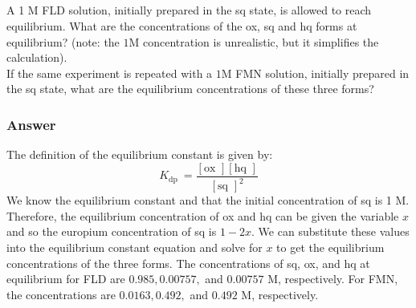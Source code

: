 \documentclass[12pt]{article}
\begin{document}
\subsection{}
A 1 M FLD solution, initially prepared in the sq state, is allowed to reach equilibrium. What are the concentrations of the ox, sq and hq forms at equilibrium? (note: the $1 \mathrm{M}$ concentration is unrealistic, but it simplifies the calculation).\\

If the same experiment is repeated with a $1 \mathrm{M}$ FMN solution, initially prepared in the sq state, what are the equilibrium concentrations of these three forms?
\subsubsection{Answer}
The definition of the equilibrium constant is given by:
\begin{equation}
K_{\text {dp }}=\frac{[\text {ox }][\text {hq }]}{[\text {sq }]^{2}}
\end{equation}
We know the equilibrium constant and that the initial concentration of sq is 1 M. Therefore, the equilibrium concentration of ox and hq can be given the variable $x$ and so the europium concentration of sq is $1-2x$. We can substitute these values into the equilibrium constant equation and solve for $x$ to get the equilibrium concentrations of the three forms. The concentrations of sq, ox, and hq at equilibrium for FLD are $0.985, 0.00757,$ and $0.00757$ M, respectively. For FMN, the concentrations are $0.0163, 0.492,$ and $0.492$ M, respectively.
\end{document}
